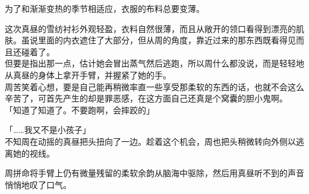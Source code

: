 为了和渐渐变热的季节相适应，衣服的布料总要变薄。

这次真昼的雪纺衬衫外观轻盈，衣料自然很薄，而且从敞开的领口看得到漂亮的肌肤。虽说里面的内衣遮住了大部分，但从周的角度，靠近过来的那东西既看得见而且还碰着了。\\

但要是指出那一点，估计她会冒出蒸气然后逃跑，所以周什么都没说，而是轻轻地从真昼的身体上拿开手臂，并握紧了她的手。\\

周苦笑着心想，要是自己能再稍微率直一些享受那柔软的东西的话，也就不会这么辛苦了，可首先产生的却是罪恶感，在这方面自己还真是个窝囊的胆小鬼啊。\\

「知道了知道了。不要跑啊，会摔跤的」

「……我又不是小孩子」\\

不知周在动摇的真昼把头扭向了一边。趁着这个机会，周也把头稍微转向外侧以逃离她的视线。

周拼命将手臂上仍有微量残留的柔软余韵从脑海中驱除，然后用真昼听不到的声音悄悄地叹了口气。
